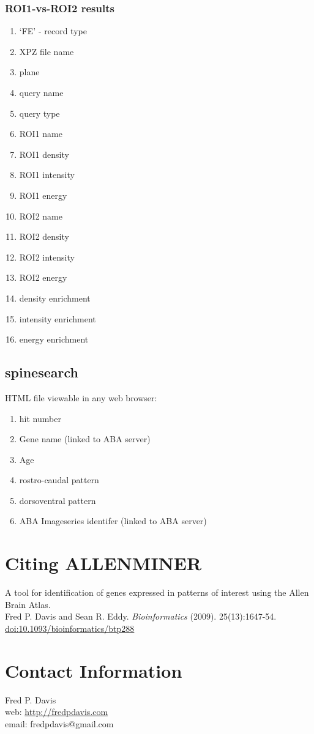 \documentclass[10pt]{article}
\begin{document}
\subsubsection{ROI1-vs-ROI2 results}
\begin{enumerate}
\item `FE' - record type
\item XPZ file name
\item plane
\item query name
\item query type
\item ROI1 name
\item ROI1 density
\item ROI1 intensity
\item ROI1 energy
\item ROI2 name
\item ROI2 density
\item ROI2 intensity
\item ROI2 energy
\item density enrichment
\item intensity enrichment
\item energy enrichment
\end{enumerate}


\subsection{spinesearch}

HTML file viewable in any web browser:

\begin{enumerate}
\item hit number
\item Gene name (linked to ABA server)
\item Age
\item rostro-caudal pattern
\item dorsoventral pattern
\item ABA Imageseries identifer (linked to ABA server)
\end{enumerate}


\section{Citing ALLENMINER}
A tool for identification of genes expressed in patterns of interest using the Allen Brain Atlas.\\Fred P. Davis and Sean R. Eddy. {\it Bioinformatics} (2009). 25(13):1647-54. \href{http://dx.doi.org/10.1093/bioinformatics/btp288}{doi:10.1093/bioinformatics/btp288}

\section{Contact Information}

Fred P. Davis\\
web: \href{http://fredpdavis.com}{http://fredpdavis.com}\\
email: fredpdavis@gmail.com
\end{document}
